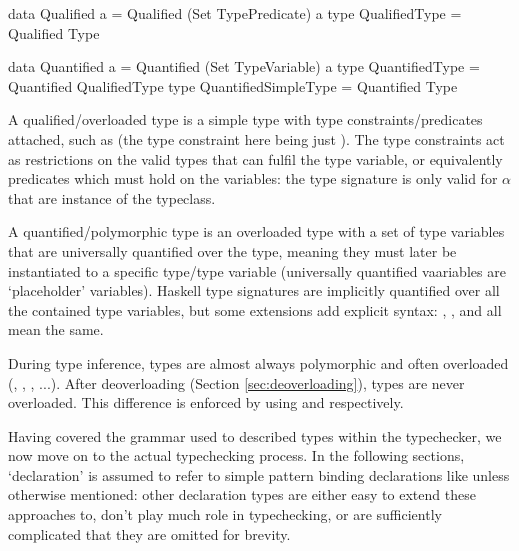 \documentclass[dissertation.tex]{subfiles}
\begin{document}
{{\begin{haskellfigure}
        data Qualified a = Qualified (Set TypePredicate) a
        type QualifiedType = Qualified Type

        data Quantified a = Quantified (Set TypeVariable) a
        type QuantifiedType = Quantified QualifiedType
        type QuantifiedSimpleType = Quantified Type
        \end{haskellfigure}

        A qualified/overloaded type is a simple type with type constraints/predicates attached, such as  (the type constraint here being just ). The type constraints act as restrictions on the valid types that can fulfil the type variable,
        or equivalently predicates which must hold on the variables: the type signature is only valid for \(\alpha\)
        that are instance of the  typeclass.
    
        A quantified/polymorphic type is an overloaded type with a set of type variables that are universally quantified
        over the type, meaning they must later be instantiated to a specific type/type variable (universally quantified
        vaariables are `placeholder' variables). Haskell type signatures are implicitly quantified over all the
        contained type variables, but some extensions add explicit syntax: , , and
         all mean the same.

        During type inference, types are almost always polymorphic and often overloaded (, , , ...). After deoverloading (Section \ref{sec:deoverloading}), types are never
        overloaded. This difference is enforced by using  and 
        respectively.

        Having covered the grammar used to described types within the typechecker, we now move on to the actual
        typechecking process. In the following sections, `declaration' is assumed to refer to simple pattern binding
        declarations like  unless otherwise mentioned: other declaration types are either easy to
        extend these approaches to, don't play much role in typechecking, or are sufficiently complicated that they are
        omitted for brevity.

}}
\end{document}
